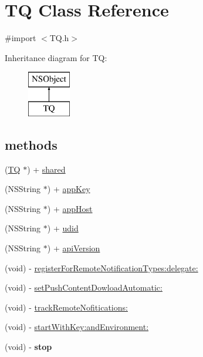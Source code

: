 \hypertarget{interface_t_q}{}\section{T\+Q Class Reference}
\label{interface_t_q}


{\ttfamily \#import $<$T\+Q.\+h$>$}

Inheritance diagram for T\+Q\+:\begin{figure}[H]
\begin{center}
\leavevmode
\includegraphics[height=2.000000cm]{interface_t_q}
\end{center}
\end{figure}
\subsection*{methods}
\begin{DoxyCompactItemize}
\item 
(\hyperlink{interface_t_q}{T\+Q} $\ast$) + \hyperlink{interface_t_q_a1eb13d05ac49bd6f39b5911b5290d147}{shared}
\item 
(N\+S\+String $\ast$) + \hyperlink{interface_t_q_a7d961d9f8f099fe554e99ef031b343b2}{app\+Key}
\item 
(N\+S\+String $\ast$) + \hyperlink{interface_t_q_ada9fbe4802e78b64975d51b746372665}{app\+Host}
\item 
(N\+S\+String $\ast$) + \hyperlink{interface_t_q_a1406ee198a5c9dcb87185b1b20e05269}{udid}
\item 
(N\+S\+String $\ast$) + \hyperlink{interface_t_q_a0a7336302a6134c1cdd67bc47e77a99f}{api\+Version}
\item 
(void) -\/ \hyperlink{interface_t_q_aff2f7801e1031105398e0deeae120ff3}{register\+For\+Remote\+Notification\+Types\+:delegate\+:}
\item 
(void) -\/ \hyperlink{interface_t_q_acbc578f00021d086d13947bf8f47723c}{set\+Push\+Content\+Dowload\+Automatic\+:}
\item 
(void) -\/ \hyperlink{interface_t_q_abf6c567f6548e43a77fea42da2da908b}{track\+Remote\+Nofitications\+:}
\item 
(void) -\/ \hyperlink{interface_t_q_a8cf7c68571dec41bfea63b3052745abf}{start\+With\+Key\+:and\+Environment\+:}
\item 
\hypertarget{interface_t_q_ab70ac313e849539d3f7a726618f7ee55}{}(void) -\/ {\bfseries stop}\label{interface_t_q_ab70ac313e849539d3f7a726618f7ee55}

\end{DoxyCompactItemize}


